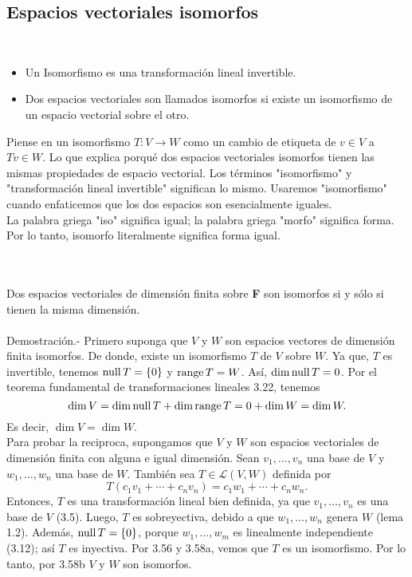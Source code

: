 \vspace{.5cm}

\subsection*{Espacios vectoriales isomorfos}

\setcounter{mydef}{57}
\begin{mydef}\,\\
    \begin{itemize}
	\item Un Isomorfismo es una transformación lineal invertible.
	\item Dos espacios vectoriales son llamados isomorfos si existe un isomorfismo de un espacio vectorial sobre el otro.
    \end{itemize}
\end{mydef}

Piense en un isomorfismo $T:V\to W$ como un cambio de etiqueta de $v\in V$ a $Tv\in W$. Lo que explica porqué dos espacios vectoriales isomorfos tienen las mismas propiedades de espacio vectorial. Los términos "isomorfismo" y "transformación lineal invertible" significan lo mismo. Usaremos "isomorfismo" cuando enfaticemos que los dos espacios son esencialmente iguales. \\
La palabra griega "iso" significa igual; la palabra griega "morfo" significa forma. Por lo tanto, isomorfo literalmente significa forma igual.

\begin{myteo}\;\\\\
    Dos espacios vectoriales de dimensión finita sobre \textbf{F} son isomorfos si y sólo si tienen la misma dimensión.\\\\	
	Demostración.-\; Primero suponga que $V$ y $W$ son espacios vectores de dimensión finita isomorfos. De donde, existe un isomorfismo $T$ de $V$ sobre $W$. Ya que, $T$ es invertible, tenemos $\operatorname{null} T=\left\{0\right\}$ y $\operatorname{range} T = W$. Así, $\dim\operatorname{null} T=0$. Por el teorema fundamental de transformaciones lineales 3.22, tenemos
	$$\dim V = \dim\operatorname{null} T + \dim\operatorname{range} T = 0 + \dim W = \dim W.$$
	Es decir, $\dim V = \dim W$.\\
	Para probar la reciproca, supongamos que $V$ y $W$ son espacios vectoriales de dimensión finita con alguna e igual dimensión. Sean $v_1,\ldots,v_n$ una base de $V$ y $w_1,\ldots,w_n$ una base de $W$. También sea $T\in \mathcal{L}(V,W)$ definida por
	$$T\left(c_1v_1+\cdots+c_nv_n\right)=c_1w_1+\cdots+c_nw_n.$$
	Entonces, $T$ es una transformación lineal bien definida, ya que $v_1,\ldots, v_n$ es una base de $V$ (3.5). Luego, $T$ es sobreyectiva, debido a que $w_1,\ldots, w_n$ genera $W$ (lema 1.2). Además, $\operatorname{null} T=\left\{0\right\}$, porque $w_1,\ldots,w_m$ es linealmente independiente (3.12); así $T$ es inyectiva. Por 3.56 y 3.58a, vemos que $T$ es un isomorfismo. Por lo tanto, por 3.58b $V$ y $W$ son isomorfos.
\end{myteo}

